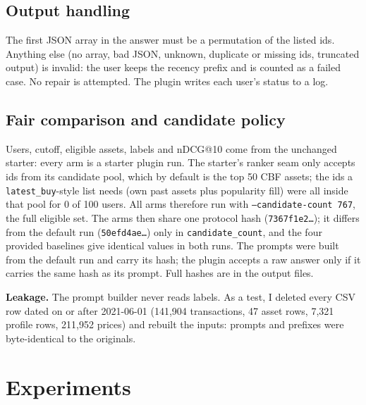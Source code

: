 \documentclass[conference]{IEEEtran}
\begin{document}
\subsection{Output handling}
The first JSON array in the answer must be a permutation of the listed ids. Anything else (no array, bad JSON, unknown, duplicate or missing ids, truncated output) is invalid: the user keeps the recency prefix and is counted as a failed case. No repair is attempted. The plugin writes each user's status to a log.

\subsection{Fair comparison and candidate policy}\label{sec:fair}
Users, cutoff, eligible assets, labels and nDCG@10 come from the unchanged starter: every arm is a starter plugin run. The starter's ranker seam only accepts ids from its candidate pool, which by default is the top 50 CBF assets; the ids a \texttt{latest\_buy}-style list needs (own past assets plus popularity fill) were all inside that pool for 0 of 100 users. All arms therefore run with \texttt{--candidate-count 767}, the full eligible set. The arms then share one protocol hash (\texttt{7367f1e2\ldots}); it differs from the default run (\texttt{50efd4ae\ldots}) only in \texttt{candidate\_count}, and the four provided baselines give identical values in both runs. The prompts were built from the default run and carry its hash; the plugin accepts a raw answer only if it carries the same hash as its prompt. Full hashes are in the output files.

\textbf{Leakage.} The prompt builder never reads labels. As a test, I deleted every CSV row dated on or after 2021-06-01 (141{,}904 transactions, 47 asset rows, 7{,}321 profile rows, 211{,}952 prices) and rebuilt the inputs: prompts and prefixes were byte-identical to the originals.

\section{Experiments}\label{sec:exp}
\end{document}

